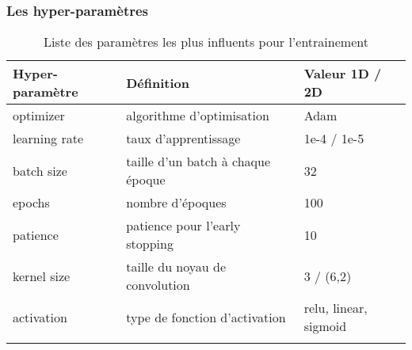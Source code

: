 

\begin{frame}
    \frametitle{Les hyper-paramètres}

    \begin{table}[h!]
        \scriptsize
        \caption{Liste des paramètres les plus influents pour l'entrainement}
        \label{tab:Parametres}
        \centering
        \begin{tabular}{l l l}
        \toprule
        \textbf{Hyper-paramètre} & \hspace*{10mm}\textbf{Définition} & \hspace*{2mm}\textbf{Valeur 1D / 2D} \\
        \midrule
        \onslide<+>
        optimizer & algorithme d'optimisation & Adam \onslide<+>\\
        learning rate & taux d'apprentissage & 1e-4 / 1e-5 \onslide<+>\\
        batch size & taille d'un batch à chaque époque & 32 \onslide<+>\\
        epochs & nombre d'époques & 100 \onslide<+>\\
        patience & patience pour l'early stopping & 10 \onslide<+>\\
        kernel size & taille du noyau de convolution & 3 / (6,2) \onslide<+>\\
        activation & type de fonction d'activation  & relu, linear, sigmoid \\
        \bottomrule\\
        \end{tabular}
    \end{table}

\end{frame}



% 
